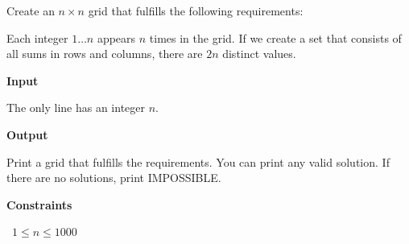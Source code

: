 Create an $n \times n$ grid that fulfills the following requirements:

Each integer $1 \dots n$ appears $n$ times in the grid.
If we create a set that consists of all sums in rows and columns, there are $2n$ distinct values.

\vspace{0.3cm}\noindent\textbf{Input}

The only line has an integer $n$.

\vspace{0.3cm}\noindent\textbf{Output}

Print a grid that fulfills the requirements. You can print any valid solution. If there are no solutions, print IMPOSSIBLE.

\vspace{0.3cm}\noindent\textbf{Constraints}

\textbullet\ $1 \le n \le 1000$